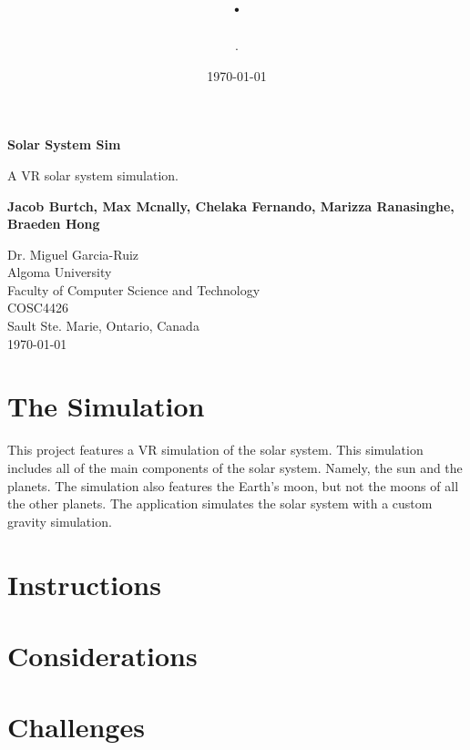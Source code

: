 \documentclass{article}
\author{.}
\title{.}
\date{\today}
\begin{document}
    \begin{titlepage}
        \begin{center}
            \vspace*{\fill}

            \Huge
            \textbf{Solar System Sim}

            \vspace{0.5cm}
            \Large
            A VR solar system simulation.

            \vspace{1.5cm}

            \textbf{Jacob Burtch, Max Mcnally, Chelaka Fernando, Marizza Ranasinghe, Braeden Hong}

            \Large
            Dr. Miguel Garcia-Ruiz\\
            Algoma University\\
            Faculty of Computer Science and Technology\\
            COSC4426\\
            Sault Ste. Marie, Ontario, Canada\\
            \today
            \vspace*{\fill}
        \end{center}
    \end{titlepage}
    \newpage
    \section{The Simulation}
    This project features a VR simulation of the solar system. This simulation includes all of the main components of the solar system. Namely, the sun and the planets. The simulation also features the Earth's moon, but not the moons of all the other planets. The application simulates the solar system with a custom gravity simulation.
    \section{Instructions}
    \section{Considerations}
    \section{Challenges}
    \newpage
    
    
\end{document}
